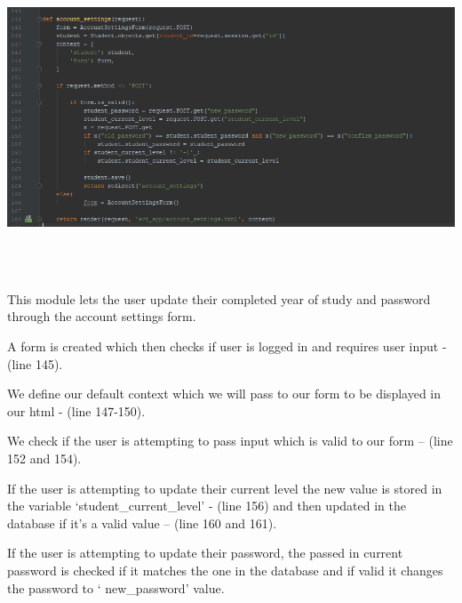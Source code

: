 \documentclass[10pt]{article}
\begin{document}
\begin{center}
\includegraphics[width=1.1\textwidth]{p14.png}
\end{center} \\ \\

\begin{description}[font=$\bullet$~\normalfont\scshape\color{red!50!black}]
\item [] This module lets the user update their completed year of study and password through the account settings form.
\item [] A form is created which then checks if user is logged in and requires user input - (line 145).
\item [] We define our default context which we will pass to our form to be displayed in our html - (line 147-150).
\item [] We check if the user is attempting to pass input which is valid to our form – (line 152 and 154).
\item [] If the user is attempting to update their current level the new value is stored in the variable ‘student\_current\_level’ - (line 156) and then updated in the database if it’s a valid value – (line 160 and 161). 
\item [] If the user is attempting to update their password, the passed in current password is checked if it matches the one in the database and if valid it changes the password to ‘ new\_password’ value.

\end{description}
\end{document}
